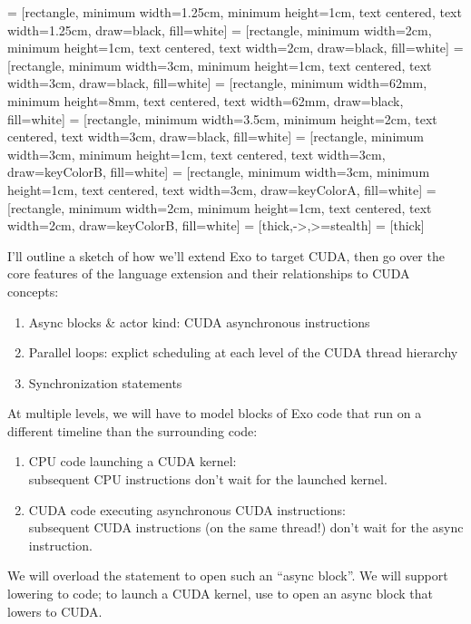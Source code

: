 


 = [rectangle, minimum width=1.25cm, minimum height=1cm, text centered, text width=1.25cm, draw=black, fill=white]
 = [rectangle, minimum width=2cm, minimum height=1cm, text centered, text width=2cm, draw=black, fill=white]
 = [rectangle, minimum width=3cm, minimum height=1cm, text centered, text width=3cm, draw=black, fill=white]
 = [rectangle, minimum width=62mm, minimum height=8mm, text centered, text width=62mm, draw=black, fill=white]
 = [rectangle, minimum width=3.5cm, minimum height=2cm, text centered, text width=3cm, draw=black, fill=white]
 = [rectangle, minimum width=3cm, minimum height=1cm, text centered, text width=3cm, draw=keyColorB, fill=white]
 = [rectangle, minimum width=3cm, minimum height=1cm, text centered, text width=3cm, draw=keyColorA, fill=white]
 = [rectangle, minimum width=2cm, minimum height=1cm, text centered, text width=2cm, draw=keyColorB, fill=white]
 = [thick,->,>=stealth]
 = [thick]



I'll outline a sketch of how we'll extend Exo to target CUDA, then go over the core features of the language extension and their relationships to CUDA concepts:

\begin{enumerate}
  \item Async blocks \& actor kind: CUDA asynchronous instructions
  \item Parallel loops: explict scheduling at each level of the CUDA thread hierarchy
  \item Synchronization statements
\end{enumerate}

\filbreak
{}

\filbreak
{}
At multiple levels, we will have to model blocks of Exo code that run on a different timeline than the surrounding code:
\begin{enumerate}
  \item CPU code launching a CUDA kernel:\\
  subsequent CPU instructions don't wait for the launched kernel.
  \item CUDA code executing asynchronous CUDA instructions:\\
  subsequent CUDA instructions (on the same thread!) don't wait for the async instruction.
\end{enumerate}
We will overload the  statement to open such an ``async block''.
We will support lowering to  code; to launch a CUDA kernel, use  to open an async block that lowers to CUDA.

